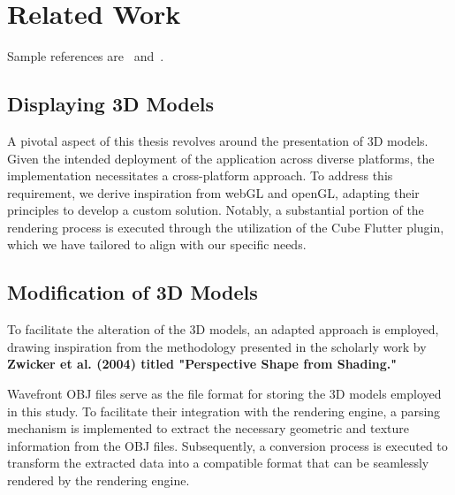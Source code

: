 \setcounter{chapter}{1}

\chapter{Related Work}

Sample references are~\cite{Zwicker04Perspective} and~\cite{Altman89QuaternionScandal}.

\section{Displaying 3D Models}

A pivotal aspect of this thesis revolves around the presentation of 3D models. Given the intended deployment of the application across diverse platforms, the implementation necessitates a cross-platform approach. 
To address this requirement, we derive inspiration from webGL and openGL, adapting their principles to develop a custom solution. 
Notably, a substantial portion of the rendering process is executed through the utilization of the Cube Flutter plugin, which we have tailored to align with our specific needs.


\section{Modification of 3D Models}

To facilitate the alteration of the 3D models, an adapted approach is employed, drawing inspiration from the methodology presented in the scholarly work by \textbf{Zwicker et al. (2004) titled "Perspective Shape from Shading."}

Wavefront OBJ files serve as the file format for storing the 3D models employed in this study. To facilitate their integration with the rendering engine, a parsing mechanism is implemented to extract the necessary geometric and texture information from the OBJ files. 
Subsequently, a conversion process is executed to transform the extracted data into a compatible format that can be seamlessly rendered by the rendering engine.

